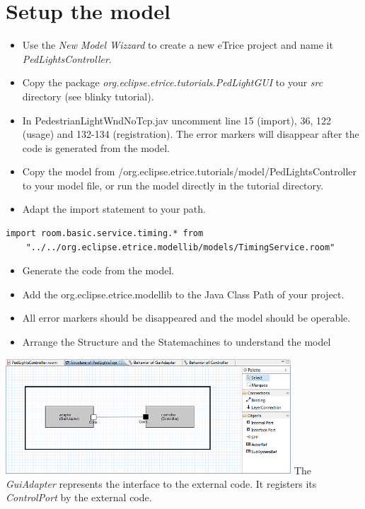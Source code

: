 \section{Setup the model}

\begin{itemize}
\item Use the \textit{New Model Wizzard} to create a new eTrice project and name it 
\textit{PedLightsController}.
\item Copy the package \textit{org.eclipse.etrice.tutorials.PedLightGUI} to your \textit{src} directory 
(see blinky tutorial).
\item In PedestrianLightWndNoTcp.jav uncomment line 15 (import), 36, 122 (usage) and 132-134 
(registration). The error markers will disappear after the code is generated from the model.
\item \begin{flushleft}Copy the model from /org.eclipse.etrice.tutorials/model/PedLightsController to your 
model file, or run the model directly in the tutorial directory.\end{flushleft} 
\item Adapt the import statement to your path.
\end{itemize}

\begin{small}
\begin{verbatim} 
import room.basic.service.timing.* from 
	"../../org.eclipse.etrice.modellib/models/TimingService.room" 
\end{verbatim}
\end{small}

\begin{itemize}
\item Generate the code from the model.
\item Add the org.eclipse.etrice.modellib to the Java Class Path of your project.
\item All error markers should be disappeared and the model should be operable. 
\item Arrange the Structure and the Statemachines to understand the model
\end{itemize}

\includegraphics[width=0.8\textwidth]{images/030-PedLights01.png}
The \textit{GuiAdapter} represents the interface to the external code. It registers its 
\textit{ControlPort} by the external code.

